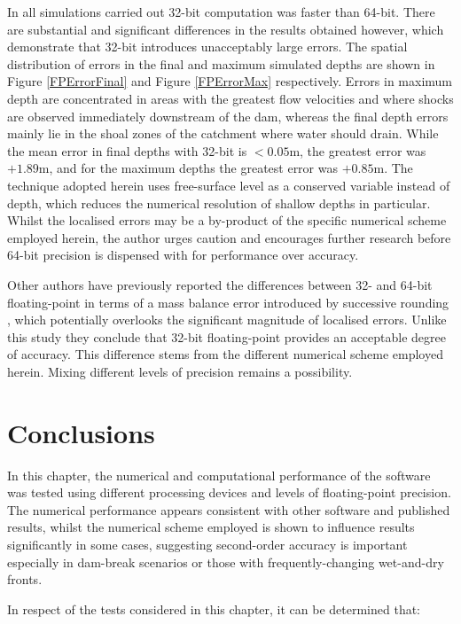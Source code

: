 In all simulations carried out 32-bit computation was faster than 64-bit. There are substantial and significant differences in the results obtained however, which demonstrate that 32-bit introduces unacceptably large errors. The spatial distribution of errors in the final and maximum simulated depths are shown in Figure \ref{FPErrorFinal} and Figure \ref{FPErrorMax} respectively.  Errors in maximum depth are concentrated in areas with the greatest flow velocities and where shocks are observed immediately downstream of the dam, whereas the final depth errors mainly lie in the shoal zones of the catchment where water should drain. While the mean error in final depths with 32-bit is \(<0.05\)m, the greatest error was \(+1.89\)m, and for the maximum depths the greatest error was \(+0.85\)m. The technique adopted herein uses free-surface level as a conserved variable instead of depth, which reduces the numerical resolution of shallow depths in particular. Whilst the localised errors may be a by-product of the specific numerical scheme employed herein, the author urges caution and encourages further research before 64-bit precision is dispensed with for performance over accuracy.

Other authors have previously reported the differences between 32- and 64-bit floating-point in terms of a mass balance error introduced by successive rounding \citep[e.g.][]{Brodtkorb2010a}, which potentially overlooks the significant magnitude of localised errors. Unlike this study they conclude that 32-bit floating-point provides an acceptable degree of accuracy. This difference stems from the different numerical scheme employed herein. Mixing different levels of precision remains a possibility. 

\section{Conclusions}

In this chapter, the numerical and computational performance of the software was tested using different processing devices and levels of floating-point precision. The numerical performance appears consistent with other software and published results, whilst the numerical scheme employed is shown to influence results significantly in some cases, suggesting second-order accuracy is important especially in dam-break scenarios or those with frequently-changing wet-and-dry fronts. 

In respect of the tests considered in this chapter, it can be determined that:

